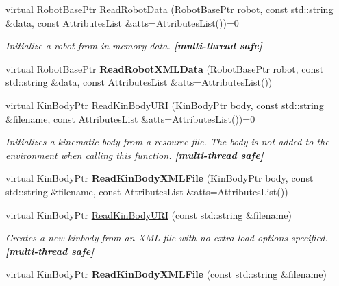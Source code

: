 \begin{DoxyCompactItemize}
\item 
virtual RobotBasePtr \hyperlink{classOpenRAVE_1_1EnvironmentBase_a70931fb3eb67326208afdc830304a0b6}{ReadRobotData} (RobotBasePtr robot, const std::string \&data, const AttributesList \&atts=AttributesList())=0
\begin{DoxyCompactList}\small\item\em Initialize a robot from in-\/memory data. {\bfseries \mbox{[}multi-\/thread safe\mbox{]}} \item\end{DoxyCompactList}\item 
\hypertarget{classOpenRAVE_1_1EnvironmentBase_ab4facbc2ca164d0ffc5842fd898e682c}{
virtual RobotBasePtr {\bfseries ReadRobotXMLData} (RobotBasePtr robot, const std::string \&data, const AttributesList \&atts=AttributesList())}
\label{classOpenRAVE_1_1EnvironmentBase_ab4facbc2ca164d0ffc5842fd898e682c}

\item 
virtual KinBodyPtr \hyperlink{classOpenRAVE_1_1EnvironmentBase_ab9fda0698f28bd76aefcad4f5ec4340a}{ReadKinBodyURI} (KinBodyPtr body, const std::string \&filename, const AttributesList \&atts=AttributesList())=0
\begin{DoxyCompactList}\small\item\em Initializes a kinematic body from a resource file. The body is not added to the environment when calling this function. {\bfseries \mbox{[}multi-\/thread safe\mbox{]}} \item\end{DoxyCompactList}\item 
\hypertarget{classOpenRAVE_1_1EnvironmentBase_a047abcaeeef915017c37dd31d34866e8}{
virtual KinBodyPtr {\bfseries ReadKinBodyXMLFile} (KinBodyPtr body, const std::string \&filename, const AttributesList \&atts=AttributesList())}
\label{classOpenRAVE_1_1EnvironmentBase_a047abcaeeef915017c37dd31d34866e8}

\item 
\hypertarget{classOpenRAVE_1_1EnvironmentBase_aaaa3f743069cc769e571f6e4ec3a732a}{
virtual KinBodyPtr \hyperlink{classOpenRAVE_1_1EnvironmentBase_aaaa3f743069cc769e571f6e4ec3a732a}{ReadKinBodyURI} (const std::string \&filename)}
\label{classOpenRAVE_1_1EnvironmentBase_aaaa3f743069cc769e571f6e4ec3a732a}

\begin{DoxyCompactList}\small\item\em Creates a new kinbody from an XML file with no extra load options specified. {\bfseries \mbox{[}multi-\/thread safe\mbox{]}} \item\end{DoxyCompactList}\item 
\hypertarget{classOpenRAVE_1_1EnvironmentBase_ac70270fc6d4580cdaed771f5fe4d2795}{
virtual KinBodyPtr {\bfseries ReadKinBodyXMLFile} (const std::string \&filename)}
\label{classOpenRAVE_1_1EnvironmentBase_ac70270fc6d4580cdaed771f5fe4d2795}


\end{DoxyCompactItemize}
